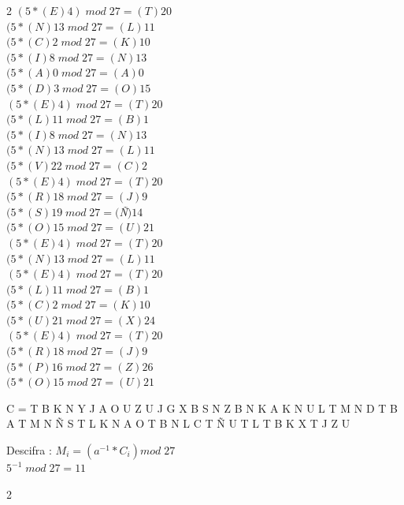 \documentclass{article}
\begin{document}
\begin{enumerate}
\begin{multicols}{2}
$(5*(E)4) \; mod \; 27 = (T)20$ \\
$(5*(N)13 \; mod \; 27 = (L)11$ \\
$(5*(C)2 \; mod \; 27 = (K)10$\\
$(5*(I)8 \; mod \; 27 = (N)13$ \\
$(5*(A)0 \; mod \; 27 = (A)0$ \\
$(5*(D)3 \; mod \; 27 = (O)15$ \\
$(5*(E)4) \; mod \; 27 = (T)20$ \\
$(5*(L)11 \; mod \; 27 = (B)1$ \\
$(5*(I)8 \; mod \; 27 = (N)13$ \\
$(5*(N)13 \; mod \; 27 = (L)11$ \\
$(5*(V)22 \; mod \; 27 = (C)2$ \\
$(5*(E)4) \; mod \; 27 = (T)20$ \\
$(5*(R)18 \; mod \; 27 = (J)9$ \\
$(5*(S)19 \; mod \; 27 = ($\textit{Ñ}$)14$ \\
$(5*(O)15 \; mod \; 27 = (U)21$ \\
$(5*(E)4) \; mod \; 27 = (T)20$ \\
$(5*(N)13 \; mod \; 27 = (L)11$ \\
$(5*(E)4) \; mod \; 27 = (T)20$ \\
$(5*(L)11 \; mod \; 27 = (B)1$ \\
$(5*(C)2 \; mod \; 27 = (K)10$\\
$(5*(U)21 \; mod \; 27 = (X)24$ \\
$(5*(E)4) \; mod \; 27 = (T)20$ \\
$(5*(R)18 \; mod \; 27 = (J)9$ \\
$(5*(P)16 \; mod \; 27 = (Z)26$ \\
$(5*(O)15 \; mod \; 27 = (U)21$ \\
 \end{multicols}


C = T B K N Y J A O U Z U J G X B S N Z B N K A K N U L T M N D T B A T M N Ñ S T L K N A O T B N L C T Ñ U T L T B K X T J Z U


Descifra : $M_{i}= (a^{-1}* C_{i}) mod \; 27$ \\

$5^{-1} \; mod \; 27 = 11$

\begin{multicols}{2}


\end{multicols}
\end{enumerate}
\end{document}
